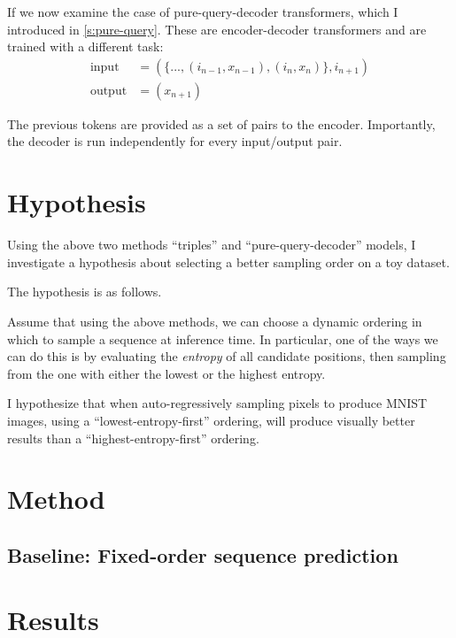 If we now examine the case of pure-query-decoder transformers, which I introduced in \cref{s:pure-query}. These are encoder-decoder transformers and are trained with a different task:
\begin{align*}
    \text{input} &= (\{ ..., (i_{n-1}, x_{n-1}), (i_{n}, x_{n}) \}, i_{n+1}) \\
    \text{output} &= (x_{n+1})
\end{align*}

The previous tokens are provided as a set of pairs to the encoder. Importantly, the decoder is run independently for every input/output pair.


\section{Hypothesis}
\label{s:a-o-hypotheses}

Using the above two methods ``triples'' and ``pure-query-decoder'' models, I investigate a hypothesis about selecting a better sampling order on a toy dataset.

The hypothesis is as follows.

Assume that using the above methods, we can choose a dynamic ordering in which to sample a sequence at inference time. In particular, one of the ways we can do this is by evaluating the \textit{entropy} of all candidate positions, then sampling from the one with either the lowest or the highest entropy.

I hypothesize that when auto-regressively sampling pixels to produce MNIST images, using a ``lowest-entropy-first'' ordering, will produce visually better results than a ``highest-entropy-first'' ordering.

\section{Method}

\subsection{}

\subsection{Baseline: Fixed-order sequence prediction}



\section{Results}
